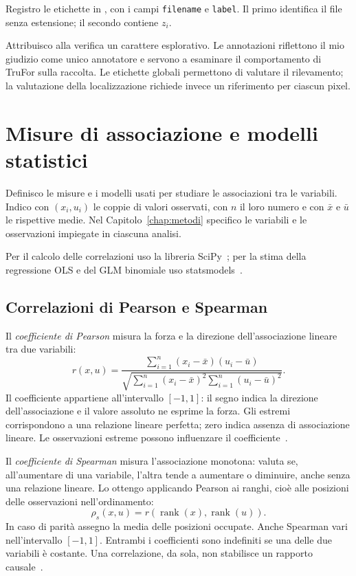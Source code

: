 Registro le etichette in , con i campi \texttt{filename} e \texttt{label}. Il primo identifica il file senza estensione; il secondo contiene $z_i$.

Attribuisco alla verifica un carattere esplorativo. Le annotazioni riflettono il mio giudizio come unico annotatore e servono a esaminare il comportamento di TruFor sulla raccolta. Le etichette globali permettono di valutare il rilevamento; la valutazione della localizzazione richiede invece un riferimento per ciascun pixel.

\section{Misure di associazione e modelli statistici}
\label{sec:materiali-misure-statistiche}

Definisco le misure e i modelli usati per studiare le associazioni tra le variabili. Indico con $(x_i,u_i)$ le coppie di valori osservati, con $n$ il loro numero e con $\bar{x}$ e $\bar{u}$ le rispettive medie. Nel Capitolo~\ref{chap:metodi} specifico le variabili e le osservazioni impiegate in ciascuna analisi.

Per il calcolo delle correlazioni uso la libreria SciPy~\cite{2020SciPy-NMeth}; per la stima della regressione OLS e del GLM binomiale uso statsmodels~\cite{josef_perktold_2024_10984387}.

\subsection{Correlazioni di Pearson e Spearman}
\label{subsec:materiali-correlazioni}

Il \emph{coefficiente di Pearson} misura la forza e la direzione dell'associazione lineare tra due variabili:
\begin{equation}
    r(x,u)=\frac{\sum_{i=1}^{n}(x_i-\bar{x})(u_i-\bar{u})}
    {\sqrt{\sum_{i=1}^{n}(x_i-\bar{x})^2\sum_{i=1}^{n}(u_i-\bar{u})^2}}.
    \label{eq:materiali-pearson}
\end{equation}
Il coefficiente appartiene all'intervallo $[-1,1]$: il segno indica la direzione dell'associazione e il valore assoluto ne esprime la forza. Gli estremi corrispondono a una relazione lineare perfetta; zero indica assenza di associazione lineare. Le osservazioni estreme possono influenzare il coefficiente~\cite{10.1098/rspl.1895.0041}.

Il \emph{coefficiente di Spearman} misura l'associazione monotona: valuta se, all'aumentare di una variabile, l'altra tende a aumentare o diminuire, anche senza una relazione lineare. Lo ottengo applicando Pearson ai ranghi, cioè alle posizioni delle osservazioni nell'ordinamento:
\begin{equation}
    \rho_s(x,u)=r\!\left(\operatorname{rank}(x),\operatorname{rank}(u)\right).
    \label{eq:materiali-spearman}
\end{equation}
In caso di parità assegno la media delle posizioni occupate. Anche Spearman vari nell'intervallo $[-1,1]$. Entrambi i coefficienti sono indefiniti se una delle due variabili è costante. Una correlazione, da sola, non stabilisce un rapporto causale~\cite{ca468a70-0be4-389a-b0b9-5dd1ff52b33f}.

